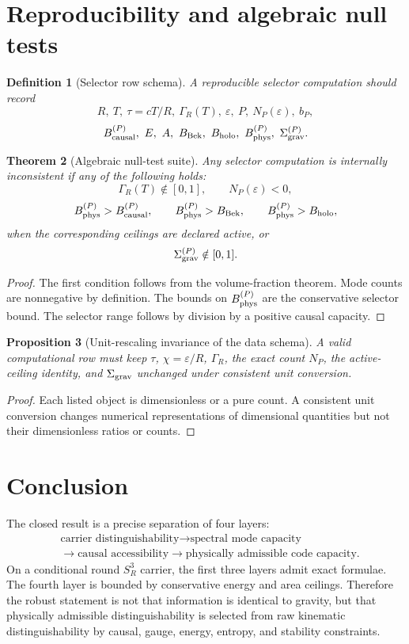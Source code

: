 \documentclass[11pt,a4paper]{article}
\newtheorem{theorem}{Theorem}[section]
\newtheorem{proposition}[theorem]{Proposition}
\newtheorem{definition}[theorem]{Definition}
\begin{document}
\section{Reproducibility and algebraic null tests}

\begin{definition}[Selector row schema]
A reproducible selector computation should record
\[
R,\ T,\ \tau=cT/R,\ \Gamma_R(T),\ \varepsilon,\ P,\ N_P(\varepsilon),\ b_P,
\]
\[
B_{\rm causal}^{(P)},\ E,\ A,\ B_{\rm Bek},\ B_{\rm holo},\ B_{\rm phys}^{(P)},\ \Sigma_{\rm grav}^{(P)}.
\]
\end{definition}

\begin{theorem}[Algebraic null-test suite]
Any selector computation is internally inconsistent if any of the following holds:
\[
\Gamma_R(T)\notin[0,1],\qquad N_P(\varepsilon)<0,
\]
\[
B_{\rm phys}^{(P)}>B_{\rm causal}^{(P)},\qquad
B_{\rm phys}^{(P)}>B_{\rm Bek},\qquad
B_{\rm phys}^{(P)}>B_{\rm holo},
\]
when the corresponding ceilings are declared active, or
\[
\Sigma_{\rm grav}^{(P)}\notin[0,1].
\]
\end{theorem}
\begin{proof}
The first condition follows from the volume-fraction theorem.  Mode counts are nonnegative by definition.  The bounds on $B_{\rm phys}^{(P)}$ are the conservative selector bound.  The selector range follows by division by a positive causal capacity.
\end{proof}

\begin{proposition}[Unit-rescaling invariance of the data schema]
A valid computational row must keep $\tau$, $\chi=\varepsilon/R$, $\Gamma_R$, the exact count $N_P$, the active-ceiling identity, and $\Sigma_{\rm grav}$ unchanged under consistent unit conversion.
\end{proposition}
\begin{proof}
Each listed object is dimensionless or a pure count.  A consistent unit conversion changes numerical representations of dimensional quantities but not their dimensionless ratios or counts.
\end{proof}

\section{Conclusion}

The closed result is a precise separation of four layers:
\[
\begin{aligned}
&\text{carrier distinguishability}
\to \text{spectral mode capacity}\\
&\to \text{causal accessibility}
\to \text{physically admissible code capacity}.
\end{aligned}
\]
On a conditional round $S^3_R$ carrier, the first three layers admit exact formulae.  The fourth layer is bounded by conservative energy and area ceilings.  Therefore the robust statement is not that information is identical to gravity, but that physically admissible distinguishability is selected from raw kinematic distinguishability by causal, gauge, energy, entropy, and stability constraints.
\end{document}
